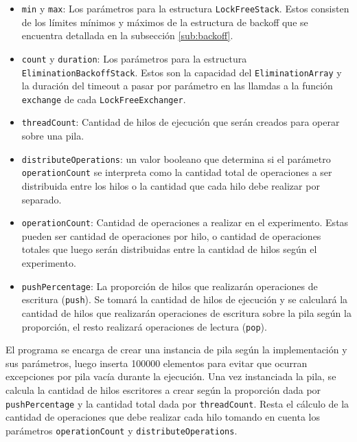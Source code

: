 \begin{itemize}
    \item \texttt{min} y \texttt{max}: Los parámetros para la estructura \texttt{LockFreeStack}. Estos consisten de los límites mínimos y máximos de la estructura de backoff que se encuentra detallada en la subsección \ref{sub:backoff}.
    \item \texttt{count} y \texttt{duration}: Los parámetros para la estructura \texttt{EliminationBackoffStack}. Estos son la capacidad del \texttt{EliminationArray} y la duración del timeout a pasar por parámetro en las llamdas a la función \texttt{exchange} de cada \texttt{LockFreeExchanger}.
    \item \texttt{threadCount}: Cantidad de hilos de ejecución que serán creados para operar sobre una pila.
    \item \texttt{distributeOperations}: un valor booleano que determina si el parámetro \texttt{operationCount} se interpreta como la cantidad total de operaciones a ser distribuida entre los hilos o la cantidad que cada hilo debe realizar por separado.
    \item \texttt{operationCount}: Cantidad de operaciones a realizar en el experimento. Estas pueden ser cantidad de operaciones por hilo, o cantidad de operaciones totales que luego serán distribuidas entre la cantidad de hilos según el experimento.
    \item \texttt{pushPercentage}: La proporción de hilos que realizarán operaciones de escritura (\texttt{push}). Se tomará la cantidad de hilos de ejecución y se calculará la cantidad de hilos que realizarán operaciones de escritura sobre la pila según la proporción, el resto realizará operaciones de lectura (\texttt{pop}).
\end{itemize}

El programa se encarga de crear una instancia de pila según la implementación y sus parámetros, luego inserta 100000 elementos para evitar que ocurran excepciones por pila vacía durante la ejecución.
Una vez instanciada la pila, se calcula la cantidad de hilos escritores a crear según la proporción dada por \texttt{pushPercentage} y la cantidad total dada por \texttt{threadCount}. Resta el cálculo de la cantidad de operaciones que debe realizar cada hilo tomando en cuenta los parámetros \texttt{operationCount} y \texttt{distributeOperations}.

